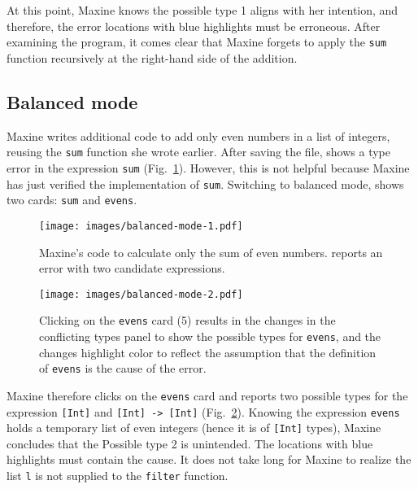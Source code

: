 At this point, Maxine knows the possible type 1 aligns with her intention, and therefore, the error locations with blue highlights must be erroneous. After examining the program, it comes clear that Maxine forgets to apply the \texttt{sum} function recursively at the right-hand side of the addition. 


\subsection{Balanced mode} \label{sub:balanced}


Maxine writes additional code to add only even numbers in a list of integers, reusing the \texttt{sum} function she wrote earlier. After saving the file, \chameleon{} shows a type error in the expression \texttt{sum} (Fig.~\ref{fig:balance-mode-1}). However, this is not helpful because Maxine has just verified the implementation of \texttt{sum}. Switching to balanced mode, \chameleon{} shows two cards: \texttt{sum} and \texttt{evens}. 

\begin{figure}[ht]
        \centering
        \texttt{[image: images/balanced-mode-1.pdf]}
        \caption[\chameleon{} walkthrough - balanced mode (1)]{
            Maxine's code to calculate only the sum 
            of even numbers. \chameleon{} reports 
            an error with two candidate expressions.
        }
        \label{fig:balance-mode-1}
\end{figure}


\begin{figure}[ht]
   \centering
        \texttt{[image: images/balanced-mode-2.pdf]}
        \caption[\chameleon{} walkthrough - balanced mode (2)]{
            Clicking on the \texttt{evens} card (5) results in the changes in the
            conflicting types panel to show the possible types for \texttt{evens},
            and the changes highlight color to reflect the assumption that the
            definition of \texttt{evens} is the cause of the error.  
        }
        \label{fig:balance-mode-2}
\end{figure}

Maxine therefore clicks on the \texttt{evens} card and \chameleon{} reports two
possible types for the expression \texttt{[Int]} and \texttt{[Int] -> [Int]}
(Fig.~\ref{fig:balance-mode-2}). Knowing the expression \texttt{evens} holds
a temporary list of even integers (hence it is of \texttt{[Int]} types), Maxine
concludes that the Possible type 2 is unintended. The locations with blue highlights must
contain the cause. It does not take long for Maxine to realize the list 
\texttt{l} is not supplied to the \texttt{filter} function.


